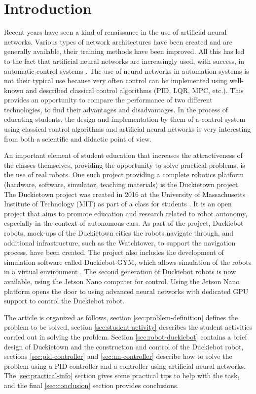 \documentclass[conference]{IEEEtran}
\begin{document}
\section{Introduction}
Recent years have seen a kind of renaissance in the use of artificial neural networks. Various types of network architectures have been created and are generally available, their training methods have been improved. All this has led to the fact that artificial neural networks are increasingly used, with success, in automatic control systems \cite{algor2030973, 786109}. The use of neural networks in automation systems is not their typical use because very often control can be implemented using well-known and described classical control algorithms (PID, LQR, MPC, etc.). This provides an opportunity to compare the performance of two different technologies, to find their advantages and disadvantages. In the process of educating students, the design and implementation by them of a control system using classical control algorithms and artificial neural networks is very interesting from both a scientific and didactic point of view.

An important element of student education that increases the attractiveness of the classes themselves, providing the opportunity to solve practical problems, is the use of real robots. One such project providing a complete robotics platform (hardware, software, simulator, teaching materials) is the Duckietown project.
The Duckietown project was created in 2016 at the University of Massachusetts Institute of Technology (MIT) as part of a class for students \cite{paull2017duckietown}. It is an open project that aims to promote education and research related to robot autonomy, especially in the context of autonomous cars. As part of the project, Duckiebot robots, mock-ups of the Duckietown cities the robots navigate through, and additional infrastructure, such as the Watchtower, to support the navigation process, have been created. 
The project also includes the development of simulation software called Duckiebot-GYM, which allows simulation of the robots in a virtual environment \cite{gym_duckietown}. The second generation of Duckiebot robots is now available, using the Jetson Nano computer for control. Using the Jetson Nano platform opens the door to using advanced neural networks with dedicated GPU support to control the Duckiebot robot.

The article is organized as follows, section \ref{sec:problem-definition} defines the problem to be solved, section \ref{sec:student-activity} describes the student activities carried out in solving the problem. Section \ref{sec:robot-duckiebot} contains a brief design of Duckietown and the construction and control of the Duckiebot robot, sections \ref{sec:pid-controller} and \ref{sec:nn-controller} describe how to solve the problem using a PID controller and a controller using artificial neural networks. The \ref{sec:practical-info} section gives some practical tips to help with the task, and the final \ref{sec:conclusion} section provides conclusions.
\end{document}
